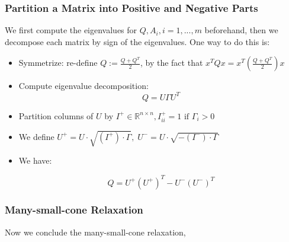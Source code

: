\documentclass[../main]{subfiles}
\begin{document}
\subsubsection{Partition a Matrix into Positive and Negative Parts}
We first compute the eigenvalues for \(Q, A_i, i=1,...,m\) beforehand, then we decompose each matrix by sign of the eigenvalues.
One way to do this is:
\begin{itemize}

  \item Symmetrize: re-define \(Q := \frac{Q + Q^T}{2}\), by the fact that \(x^TQx = x^T(\frac{Q + Q^T}{2})x\)

  \item Compute eigenvalue decomposition:
        \[Q = U\Gamma U^T\]
  \item Partition columns of \(U\) by
        \(I^+ \in \mathbb{R}^{n\times n}, I^+_{ii} = 1 \textrm{  if  }\Gamma_i > 0\)

  \item We define \(U^+ = U\cdot \sqrt{(I^+)\cdot\Gamma},\; U^- = U \cdot\sqrt{-(I^-)\cdot\Gamma}\)
  \item We have:

        \[Q =  U^+ (U^+)^T - U^- (U^-)^T\]
\end{itemize}

\subsubsection{Many-small-cone Relaxation}

Now we conclude the many-small-cone relaxation,
\end{document}

